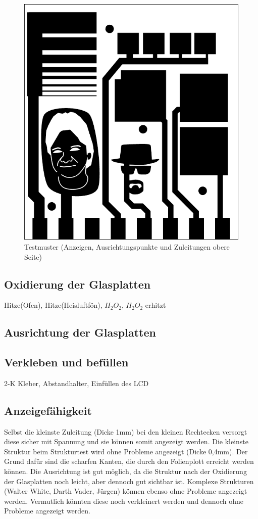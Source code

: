 \begin{figure}[t]
  \centering
  \includegraphics[width=\linewidth, keepaspectratio]{Bilder/testmuster-seite2}
  \caption{Testmuster (Anzeigen, Ausrichtungspunkte und Zuleitungen obere Seite)}
  \label{testmuster-seite2}
\end{figure}

\subsection{Oxidierung der Glasplatten}
Hitze(Ofen), Hitze(Heisluftfön), \(H_2O_2\), \(H_2O_2\) erhitzt
\subsection{Ausrichtung der Glasplatten}
\subsection{Verkleben und befüllen}
2-K Kleber, Abstandhalter, Einfüllen des LCD
\subsection{Anzeigefähigkeit}
Selbst die kleinste Zuleitung (Dicke 1mm) bei den kleinen Rechtecken versorgt diese sicher mit Spannung und sie können somit angezeigt werden. Die kleinste Struktur beim Strukturtest wird ohne Probleme angezeigt (Dicke 0,4mm). Der Grund dafür sind die scharfen Kanten, die durch den Folienplott erreicht werden können. Die Ausrichtung ist gut möglich, da die Struktur nach der Oxidierung der Glasplatten noch leicht, aber dennoch gut sichtbar ist. Komplexe Strukturen (Walter White, Darth Vader, Jürgen) können ebenso ohne Probleme angezeigt werden. Vermutlich könnten diese noch verkleinert werden und dennoch ohne Probleme angezeigt werden.